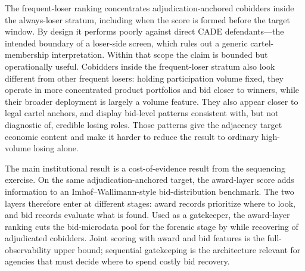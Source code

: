 The frequent-loser ranking concentrates adjudication-anchored
cobidders inside the always-loser stratum, including when the
score is formed before the target window. By design it performs
poorly against direct CADE defendants---the intended boundary of
a loser-side screen, which rules out a generic cartel-membership
interpretation. Within that scope the claim is bounded but
operationally useful. Cobidders inside the frequent-loser stratum
also look different from other frequent losers: holding
participation volume fixed, they operate in more concentrated
product portfolios and bid closer to winners, while their broader
deployment is largely a volume feature. They also appear closer
to legal cartel anchors, and display bid-level patterns
consistent with, but not diagnostic of, credible losing roles.
Those patterns give the adjacency target economic content and
make it harder to reduce the result to ordinary high-volume
losing alone.

The main institutional result is a cost-of-evidence result from
the sequencing exercise. On the same adjudication-anchored
target, the award-layer score adds information to an
Imhof--Wallimann-style bid-distribution benchmark. The two
layers therefore enter at different stages: award records
prioritize where to look, and bid records evaluate what is
found. Used as a gatekeeper, the award-layer ranking cuts the
bid-microdata pool for the forensic stage by \valGateFootprintPct{} while
recovering \valGateSeqKTwoKOneTPIn{} of \valCobidders{} adjudicated cobidders. Joint scoring with
award and bid features is the full-observability upper bound;
sequential gatekeeping is the architecture relevant for agencies
that must decide where to spend costly bid recovery.

